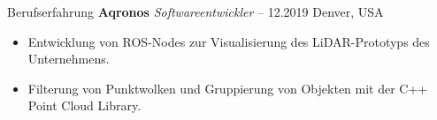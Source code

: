 \begin{rubric}{Berufserfahrung}
%
%
\entry*[] \textbf{Aqronos} \hfill \textit{Softwareentwickler}  -- 12.2019 \hfill Denver, USA \newline  
\vspace{\CVItemizeHeaderSpacing} \begin{itemize} 
	\setlength{\itemsep}{\CVItemizeSpacing}  
	\item Entwicklung von ROS-Nodes zur Visualisierung des LiDAR-Prototyps des Unternehmens.  
	\item Filterung von Punktwolken und Gruppierung von Objekten mit der C++ Point Cloud Library.  
\end{itemize}

\begin{comment}
%
%
\entry*[] \textbf{Creative Edge LLC} \hfill \textit{Softwareentwickler} \newline  
08.2017 -- 09.2018 \hfill Denver, USA \newline  
\vspace{\CVItemizeHeaderSpacing} \begin{itemize}  
	\setlength{\itemsep}{\CVItemizeSpacing}  
	\item Entwicklung von Anwendungen für das Kryptowährungs-Mining unter Windows und Linux.  
	\item Erstellung von Software zur Verwaltung von Betriebssystemtreibern, Systemkonfigurationen und Tools von Drittanbietern.  
\end{itemize}
\end{comment}

\end{rubric}
